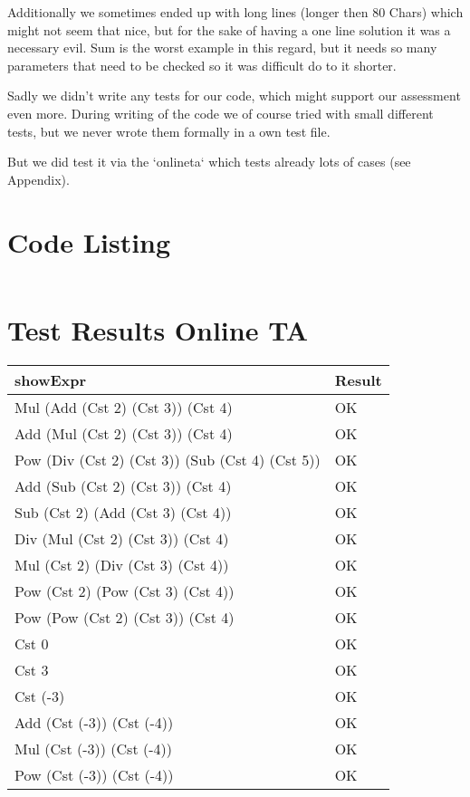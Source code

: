 \documentclass[12pt,a4paper]{article}
\begin{document}
Additionally we sometimes ended up with long lines (longer then 80 Chars) which might not seem that nice, but for the sake of having a one line solution it was a necessary evil. Sum is the worst example in this regard, but it needs so many parameters that need to be checked so it was difficult do to it shorter.

Sadly we didn't write any tests for our code, which might support our assessment even more. During writing of the code we of course tried with small different tests, but we never wrote them formally in a own test file.

But we did test it via the `onlineta` which tests already lots of cases (see Appendix).


\appendix
\section{Code Listing}

\inputminted{haskell}{src/Arithmetic.hs}

\section{Test Results Online TA}
\begin{tabularx}{\textwidth}[!htbp]{X|l}
 \textbf{showExpr} & Result \\
 \hline
   Mul (Add (Cst 2) (Cst 3)) (Cst 4) & OK \\
   \hline
    Add (Mul (Cst 2) (Cst 3)) (Cst 4) & OK \\
    Pow (Div (Cst 2) (Cst 3)) (Sub (Cst 4) (Cst 5)) & OK \\
    \hline
    Add (Sub (Cst 2) (Cst 3)) (Cst 4) & OK \\
    \hline
    Sub (Cst 2) (Add (Cst 3) (Cst 4)) & OK \\
    \hline
    Div (Mul (Cst 2) (Cst 3)) (Cst 4) & OK \\
    \hline
    Mul (Cst 2) (Div (Cst 3) (Cst 4)) & OK \\
    \hline
    Pow (Cst 2) (Pow (Cst 3) (Cst 4))& OK \\
    \hline
    Pow (Pow (Cst 2) (Cst 3)) (Cst 4)& OK \\
    \hline
    Cst 0 & OK \\
    \hline
    Cst 3 & OK \\
    \hline
    Cst (-3) & OK \\
    \hline
    Add (Cst (-3)) (Cst (-4)) & OK \\
    \hline
    Mul (Cst (-3)) (Cst (-4)) & OK \\
    \hline
    Pow (Cst (-3)) (Cst (-4)) & OK \\
     \hline
\end{tabularx}
\end{document}
